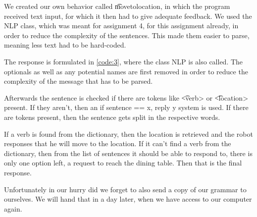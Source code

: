 
We created our own behavior called \t{movetolocation}, in which the program received text input, for which it then had to give adequate feedback. We used the NLP class, which was meant for assignment 4, for this assignment already, in order to reduce the complexity of the sentences. This made them easier to parse, meaning less text had to be hard-coded.



The response is formulated in \ref{code:3}, where the class NLP is also called. The optionals as well as any potential names are first removed in order to reduce the complexity of the message that has to be parsed. 

Afterwards the sentence is checked if there are tokens like \t{<verb>} or \t{<location>} present. If they aren't, then an if sentence == x, reply y system is used. If there are tokens present, then the sentence gets split in the respective words. 

If a verb is found from the dictionary, then the location is retrieved and the robot responses that he will move to the location. If it can't find a verb from the dictionary, then from the list of sentences it should be able to respond to, there is only one option left, a request to reach the dining table. Then that is the final response.

Unfortunately in our hurry did we forget to also send a copy of our grammar to ourselves. We will hand that in a day later, when we have access to our computer again.